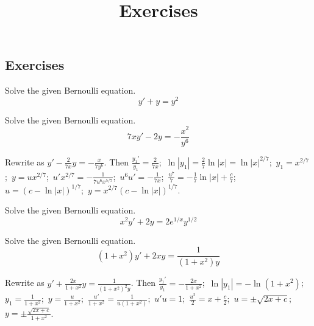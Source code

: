 \documentclass{ximera}
\title{Exercises} \license{CC BY-NC-SA 4.0}
\begin{document}
\begin{abstract}
\end{abstract}
\maketitle

\begin{onlineOnly}
\section*{Exercises}
\end{onlineOnly}

\begin{problem}\label{exer:2.4.1} Solve the given Bernoulli
equation.
$$y'+y=y^2$$
\end{problem}

\begin{problem}\label{exer:2.4.2} Solve the given Bernoulli
equation.
$$7xy'-2y=-\frac{x^2}{y^6}$$



\begin{solution}
     Rewrite as $y'-\frac{2}{7x}y=-\frac{x}{7y^6}$. Then
$\frac{y_1'}{ y_1}=\frac{2}{7x}$;\,
$\ln|y_1|=\frac{2}{7}\ln|x|=\ln|x|^{2/7}$;\,
$y_1=x^{2/7}$;\,
$y=ux^{2/7}$;\,
$u'x^{2/7}=-\frac{1}{7u^6x^{5/7}}$;\,
$u^6u'=-\frac{1}{7x}$;\,
$\frac{u^7}{7}=-\frac{1}{7}\ln|x|+\frac{c}{7}$;\,
$u=(c-\ln|x|)^{1/7}$;\,
$y=x^{2/7}(c-\ln|x|)^{1/7}$.
\end{solution}
\end{problem}

\begin{problem}\label{exer:2.4.3} Solve the given Bernoulli
equation.
$$x^2y'+2y=2e^{1/x}y^{1/2}$$
\end{problem}

\begin{problem}\label{exer:2.4.4} Solve the given Bernoulli
equation.
$$(1+x^2)y'+2xy=\frac{1}{(1+x^2)y}$$



\begin{solution}
    Rewrite as $y'+\frac{2x}{1+x^2}y=\frac{1}{(1+x^2)^2y}$.
Then
$\frac{y_1'}{ y_1}=-\frac{2x}{1+x^2}$;\,
$\ln|y_1|=-\ln(1+x^2)$;\,
$y_1=\frac{1}{1+x^2}$;\,
$y=\frac{u}{1+x^2}$;\,
$\frac{u'}{1+x^2}=\frac{1}{ u(1+x^2)}$;\,
$u'u=1$;\,
$\frac{u^2}{2}=x+\frac{c}{2}$;\,
$u=\pm\sqrt{2x+c}$;\,
$y=\pm\frac{\sqrt{2x+c}}{1+x^2}$.
\end{solution}
\end{problem}
\end{document}
